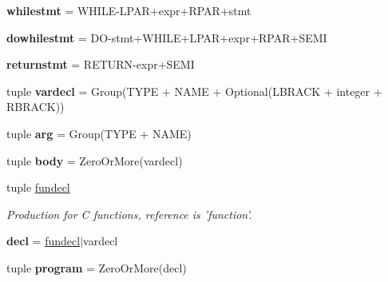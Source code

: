 \begin{DoxyCompactItemize}
\item 
\hypertarget{classxutools_1_1parsers_1_1_subset_c_parser_aa66702e37882433c6772cd3d03d07326}{{\bfseries whilestmt} = W\-H\-I\-L\-E-\/L\-P\-A\-R+expr+R\-P\-A\-R+stmt}\label{classxutools_1_1parsers_1_1_subset_c_parser_aa66702e37882433c6772cd3d03d07326}

\item 
\hypertarget{classxutools_1_1parsers_1_1_subset_c_parser_a7c8da7a57e68fb07a2b1a700d3655527}{{\bfseries dowhilestmt} = D\-O-\/stmt+W\-H\-I\-L\-E+L\-P\-A\-R+expr+R\-P\-A\-R+S\-E\-M\-I}\label{classxutools_1_1parsers_1_1_subset_c_parser_a7c8da7a57e68fb07a2b1a700d3655527}

\item 
\hypertarget{classxutools_1_1parsers_1_1_subset_c_parser_aa038d818dc4c4d499007a609686709f7}{{\bfseries returnstmt} = R\-E\-T\-U\-R\-N-\/expr+S\-E\-M\-I}\label{classxutools_1_1parsers_1_1_subset_c_parser_aa038d818dc4c4d499007a609686709f7}

\item 
\hypertarget{classxutools_1_1parsers_1_1_subset_c_parser_a1cc445a0d3dfd7f4f560a9dc0f8c81d4}{tuple {\bfseries vardecl} = Group(T\-Y\-P\-E + N\-A\-M\-E + Optional(L\-B\-R\-A\-C\-K + integer + R\-B\-R\-A\-C\-K))}\label{classxutools_1_1parsers_1_1_subset_c_parser_a1cc445a0d3dfd7f4f560a9dc0f8c81d4}

\item 
\hypertarget{classxutools_1_1parsers_1_1_subset_c_parser_ae18cce66102a7ad7422c5323903ff8a1}{tuple {\bfseries arg} = Group(T\-Y\-P\-E + N\-A\-M\-E)}\label{classxutools_1_1parsers_1_1_subset_c_parser_ae18cce66102a7ad7422c5323903ff8a1}

\item 
\hypertarget{classxutools_1_1parsers_1_1_subset_c_parser_ad4176d08dbf7994ddfa2173aaa77d6c7}{tuple {\bfseries body} = Zero\-Or\-More(vardecl)}\label{classxutools_1_1parsers_1_1_subset_c_parser_ad4176d08dbf7994ddfa2173aaa77d6c7}

\item 
tuple \hyperlink{classxutools_1_1parsers_1_1_subset_c_parser_a4224655841f4780679e6d2eca53e57bf}{fundecl}
\begin{DoxyCompactList}\small\item\em Production for C functions, reference is 'function'. \end{DoxyCompactList}\item 
\hypertarget{classxutools_1_1parsers_1_1_subset_c_parser_a13cdd56ec68079d0630576136462009c}{{\bfseries decl} = \hyperlink{classxutools_1_1parsers_1_1_subset_c_parser_a4224655841f4780679e6d2eca53e57bf}{fundecl}$|$vardecl}\label{classxutools_1_1parsers_1_1_subset_c_parser_a13cdd56ec68079d0630576136462009c}

\item 
\hypertarget{classxutools_1_1parsers_1_1_subset_c_parser_a9ddcecb9b92439007e5b420a06187ace}{tuple {\bfseries program} = Zero\-Or\-More(decl)}\label{classxutools_1_1parsers_1_1_subset_c_parser_a9ddcecb9b92439007e5b420a06187ace}

\end{DoxyCompactItemize}


